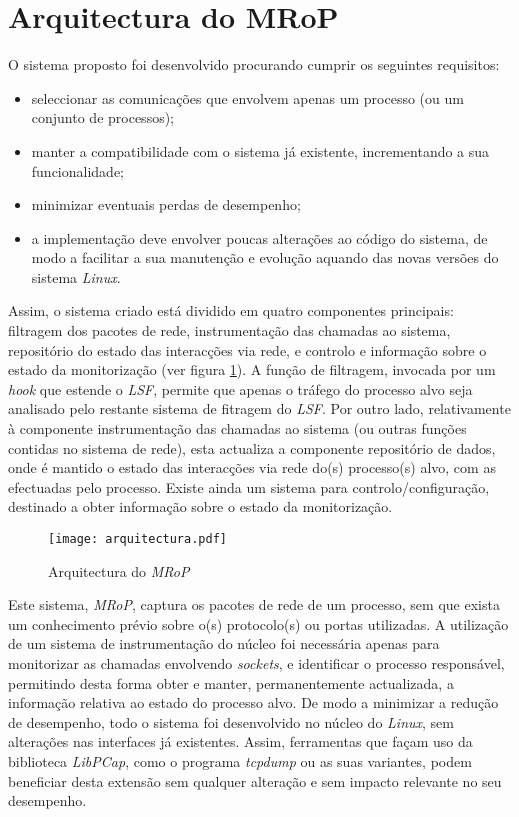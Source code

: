 \section{Arquitectura do MRoP}
\label{sec:mrop_architecture}

O sistema proposto foi desenvolvido procurando cumprir os seguintes requisitos:
\begin{itemize}
\item seleccionar as comunicações que envolvem apenas um processo (ou um conjunto de processos);
\item manter a compatibilidade com o sistema já existente, incrementando a sua funcionalidade;
\item minimizar eventuais perdas de desempenho;
\item a implementação deve envolver poucas alterações ao código do sistema, de modo a facilitar a sua manutenção e evolução aquando das novas versões do sistema \textit{Linux}.
\end{itemize}

Assim, o sistema criado está dividido em quatro componentes principais: filtragem dos pacotes de rede, instrumentação das chamadas ao sistema, repositório do estado das interacções via rede, e controlo e informação sobre o estado da monitorização (ver figura \ref{fig:arquitectura}).
A função de filtragem, invocada por um \textit{hook} que estende o \textit{LSF}, permite que apenas o tráfego do processo alvo seja analisado pelo restante sistema de fitragem do \textit{LSF}.
Por outro lado, relativamente à componente instrumentação das chamadas ao sistema (ou outras funções contidas no sistema de rede), esta actualiza a componente repositório de dados, onde é mantido o estado das interacções via rede do(s) processo(s) alvo, com as efectuadas pelo processo.
Existe ainda um sistema para controlo/configuração, destinado a obter informação sobre o estado da monitorização.

\begin{figure}[htbp]
\begin{center}
\texttt{[image: arquitectura.pdf]} 
\caption{Arquitectura do \textit{MRoP}}
\label{fig:arquitectura}
\end{center}
\end{figure}

Este sistema, \textit{MRoP}, captura os pacotes de rede de um processo, sem que exista um conhecimento prévio sobre o(s) protocolo(s) ou portas utilizadas.
A utilização de um sistema de instrumentação do núcleo foi necessária apenas para monitorizar as chamadas envolvendo \emph{sockets}, e identificar o processo responsável, permitindo desta forma obter e manter, permanentemente actualizada, a informação relativa ao estado do processo alvo.
De modo a minimizar a redução de desempenho, todo o sistema foi desenvolvido no núcleo do \textit{Linux}, sem alterações nas interfaces já existentes.
Assim, ferramentas que façam uso da biblioteca \textit{LibPCap}, como o programa \textit{tcpdump} ou as suas variantes, podem beneficiar desta extensão sem qualquer alteração e sem impacto relevante no seu desempenho.

